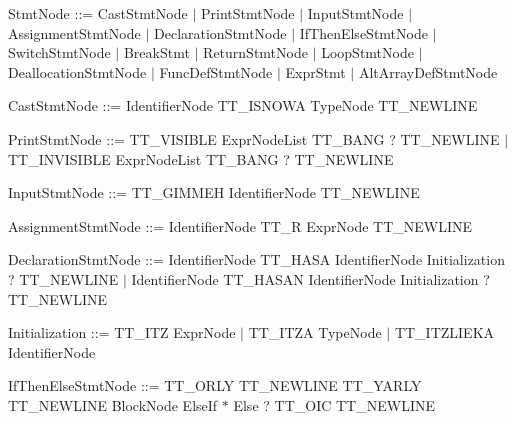 \begin{DoxyParagraph}{}
Stmt\+Node \+:\+:= Cast\+Stmt\+Node $\vert$ Print\+Stmt\+Node $\vert$ Input\+Stmt\+Node $\vert$ Assignment\+Stmt\+Node $\vert$ Declaration\+Stmt\+Node $\vert$ If\+Then\+Else\+Stmt\+Node $\vert$ Switch\+Stmt\+Node $\vert$ Break\+Stmt $\vert$ Return\+Stmt\+Node $\vert$ Loop\+Stmt\+Node $\vert$ Deallocation\+Stmt\+Node $\vert$ Func\+Def\+Stmt\+Node $\vert$ Expr\+Stmt $\vert$ Alt\+Array\+Def\+Stmt\+Node
\end{DoxyParagraph}
\begin{DoxyParagraph}{}
Cast\+Stmt\+Node \+:\+:= Identifier\+Node {\ttfamily T\+T\+\_\+\+I\+S\+N\+O\+WA} Type\+Node {\ttfamily T\+T\+\_\+\+N\+E\+W\+L\+I\+NE} 
\end{DoxyParagraph}
\begin{DoxyParagraph}{}
Print\+Stmt\+Node \+:\+:= {\ttfamily T\+T\+\_\+\+V\+I\+S\+I\+B\+LE} Expr\+Node\+List {\ttfamily T\+T\+\_\+\+B\+A\+NG} ? {\ttfamily T\+T\+\_\+\+N\+E\+W\+L\+I\+NE} $\vert$ {\ttfamily T\+T\+\_\+\+I\+N\+V\+I\+S\+I\+B\+LE} Expr\+Node\+List {\ttfamily T\+T\+\_\+\+B\+A\+NG} ? {\ttfamily T\+T\+\_\+\+N\+E\+W\+L\+I\+NE} 
\end{DoxyParagraph}
\begin{DoxyParagraph}{}
Input\+Stmt\+Node \+:\+:= {\ttfamily T\+T\+\_\+\+G\+I\+M\+M\+EH} Identifier\+Node {\ttfamily T\+T\+\_\+\+N\+E\+W\+L\+I\+NE} 
\end{DoxyParagraph}
\begin{DoxyParagraph}{}
Assignment\+Stmt\+Node \+:\+:= Identifier\+Node {\ttfamily T\+T\+\_\+R} Expr\+Node {\ttfamily T\+T\+\_\+\+N\+E\+W\+L\+I\+NE} 
\end{DoxyParagraph}
\begin{DoxyParagraph}{}
Declaration\+Stmt\+Node \+:\+:= Identifier\+Node {\ttfamily T\+T\+\_\+\+H\+A\+SA} Identifier\+Node Initialization ? {\ttfamily T\+T\+\_\+\+N\+E\+W\+L\+I\+NE} $\vert$ Identifier\+Node {\ttfamily T\+T\+\_\+\+H\+A\+S\+AN} Identifier\+Node Initialization ? {\ttfamily T\+T\+\_\+\+N\+E\+W\+L\+I\+NE} 
\end{DoxyParagraph}
\begin{DoxyParagraph}{}
Initialization \+:\+:= {\ttfamily T\+T\+\_\+\+I\+TZ} Expr\+Node $\vert$ {\ttfamily T\+T\+\_\+\+I\+T\+ZA} Type\+Node $\vert$ {\ttfamily T\+T\+\_\+\+I\+T\+Z\+L\+I\+E\+KA} Identifier\+Node
\end{DoxyParagraph}
\begin{DoxyParagraph}{}
If\+Then\+Else\+Stmt\+Node \+:\+:= {\ttfamily T\+T\+\_\+\+O\+R\+LY} {\ttfamily T\+T\+\_\+\+N\+E\+W\+L\+I\+NE} {\ttfamily T\+T\+\_\+\+Y\+A\+R\+LY} {\ttfamily T\+T\+\_\+\+N\+E\+W\+L\+I\+NE} Block\+Node Else\+If $\ast$ Else ? {\ttfamily T\+T\+\_\+\+O\+IC} {\ttfamily T\+T\+\_\+\+N\+E\+W\+L\+I\+NE} 
\end{DoxyParagraph}
